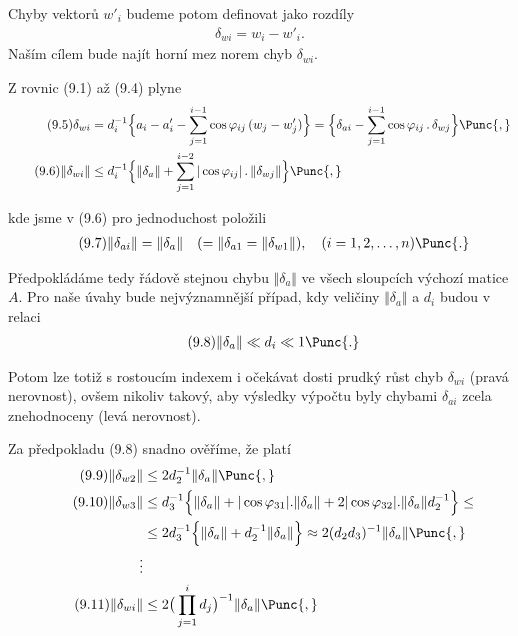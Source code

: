 \noindent
Chyby vektorů $w'_i$ budeme potom definovat jako rozdíly
%
\begin{align*}
  \tag{9.4}
  \delta_{wi} = w_i - w'_i.
\end{align*}
%
Naším cílem bude najít horní mez norem chyb $\delta_{wi}$.


Z rovnic (9.1) až (9.4) plyne
%
\begin{align*}
  \tag{9.5}
  \delta_{wi} &= d_i^{-1}\Big\{a_i - a'_i
    - \sum_{j=1}^{i-1} \cos \varphi_{ij}\,(w_j - w'_j)
    \Big\} =
    \Big\{\delta_{ai}
    - \sum_{j=1}^{i-1} \cos \varphi_{ij}\,.\,\delta_{wj} \Big\} \Punc{,}\\
    \tag{9.6}
    \Vert\delta_{wi}\Vert &\le d_i^{-1}\Big\{
    \Vert\delta_a\Vert + \sum_{j=1}^{i-2}
    |\cos \varphi_{ij}|\,.\,\Vert\delta_{wj}\Vert
    \Big\}\Punc{,}
\end{align*}

\noindent
kde jsme v (9.6) pro jednoduchost položili
%
\begin{align*}
  \tag{9.7}
  \Vert\delta_{ai} \Vert = \Vert\delta_a\Vert \quad
  (=\Vert\delta_{a1} = \Vert\delta_{w1}\Vert), \quad
  (i=1,2,\dots,n)\Punc{.}
\end{align*}

\noindent
Předpokládáme tedy řádově stejnou chybu $\Vert\delta_a\Vert$ ve všech
sloupcích výchozí matice $A$. Pro naše úvahy bude nejvýznamnější
případ, kdy veličiny $\Vert\delta_a\Vert$ a $d_i$ budou v relaci
%
\begin{align*}
  \tag{9.8}
  \Vert\delta_a\Vert \ll d_i \ll 1\Punc{.}
\end{align*}

\noindent
Potom lze totiž s rostoucím indexem i očekávat dosti prudký růst chyb
$\delta_{wi}$ (pravá nerovnost), ovšem nikoliv takový, aby výsledky
výpočtu byly chybami $\delta_{ai}$ zcela znehodnoceny (levá
nerovnost).

Za předpokladu (9.8) snadno ověříme, že platí 
%
\begin{align*}
  \tag{9.9}
  \Vert \delta_{w2}\Vert &\le 2d_2^{-1} \Vert\delta_a\Vert\Punc{,} \\
  \tag{9.10}
  \Vert\delta_{w3}\Vert &\le d_3^{-1}
  \Big\{ \Vert\delta_a\Vert + |\cos \varphi_{31}|.\Vert\delta_a\Vert
  + 2|\cos \varphi_{32}|.\Vert\delta_a\Vert d_2^{-1} \Big\} \le \\
  &\le 2d_3^{-1}\Big\{\Vert\delta_a\Vert + d_2^{-1}\Vert\delta_a\Vert\Big\}
  \approx 2 (d_2d_3)^{-1}\Vert\delta_a\Vert\Punc{,}\\
  \vdots \\
  \tag{9.11}
  \Vert \delta_{wi} \Vert &\le
  2\big(\prod_{j=1}^i d_j\big)^{-1} \Vert \delta_a \Vert \Punc{,}
\end{align*}

